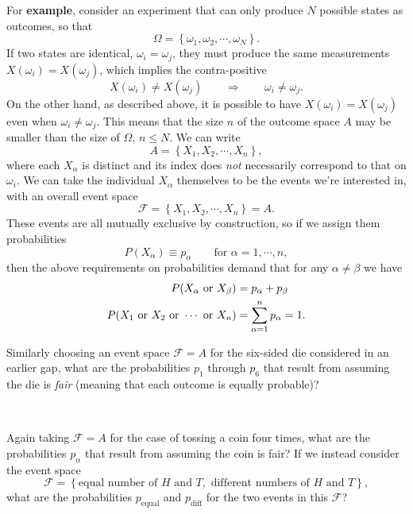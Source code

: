 \documentclass[12 pt]{article}
\newcommand{\cF}{\ensuremath{\mathcal F} }
\newcommand{\al}{\ensuremath{\alpha} }
\newcommand{\be}{\ensuremath{\beta} }
\newcommand{\om}{\ensuremath{\omega} }
\newcommand{\Om}{\ensuremath{\Omega} }
\newcommand{\Lra}{\ensuremath{\Longrightarrow} }
\begin{document}
For \textbf{example}, consider an experiment that can only produce $N$ possible states as outcomes, so that
\begin{equation*}
  \Om = \left\{\om_1, \om_2, \cdots, \om_N\right\}.
\end{equation*}
If two states are identical, $\om_i = \om_j$, they must produce the same measurements $X(\om_i) = X(\om_j)$, which implies the contra-positive
\begin{equation*}
  X(\om_i) \ne X(\om_j) \qquad \Lra \qquad \om_i \ne \om_j.
\end{equation*}
On the other hand, as described above, it is possible to have $X(\om_i) = X(\om_j)$ even when $\om_i \ne \om_j$.
This means that the size $n$ of the outcome space $A$ may be smaller than the size of $\Om$, $n \leq N$.
We can write
\begin{equation*}
  A = \left\{X_1, X_2, \cdots, X_n\right\},
\end{equation*}
where each $X_{\al}$ is distinct and its index does \textit{not} necessarily correspond to that on $\om_i$.
We can take the individual $X_{\al}$ themselves to be the events we're interested in, with an overall event space
\begin{equation*}
  \cF = \left\{X_1, X_2, \cdots, X_n\right\} = A.
\end{equation*}
These events are all mutually exclusive by construction, so if we assign them probabilities
\begin{equation*}
  P(X_{\al}) \equiv p_{\al} \qquad \mbox{for } \al = 1, \cdots, n,
\end{equation*}
then the above requirements on probabilities demand that for any $\al \ne \be$ we have
\begin{align*}
  P(X_{\al} \mbox{ or } X_{\be}) & = p_{\al} + p_{\be} \\
  P(X_1 \hbox{ or } X_2 \hbox{ or } \cdots \mbox{ or } X_n) & = \sum_{\al = 1}^n p_{\al} = 1.
\end{align*}

Similarly choosing an event space $\cF = A$ for the six-sided die considered in an earlier gap, what are the probabilities $p_1$ through $p_6$ that result from assuming the die is \textit{fair} (meaning that each outcome is equally probable)?
\begin{mdframed}
  \ \\[100 pt]
\end{mdframed}
\newpage %
\noindent Again taking $\cF = A$ for the case of tossing a coin four times, what are the probabilities $p_{\al}$ that result from assuming the coin is fair?
If we instead consider the event space
\begin{equation*}
  \cF = \left\{\mbox{equal number of } H \mbox{ and } T, \mbox{ different numbers of } H \mbox{ and } T\right\},
\end{equation*}
what are the probabilities $p_{\text{equal}}$ and $p_{\text{diff}}$ for the two events in this $\cF$?
\begin{mdframed}
  \ \\[100 pt]
\end{mdframed}
\end{document}
